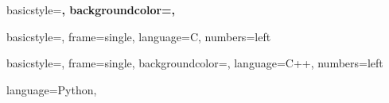    {basicstyle=\scriptsize\bf\ttfamily,
    backgroundcolor=\color{gray75},    
    }

   {basicstyle=\scriptsize,
	frame=single,
	language=C,
	numbers=left
   }
   
   {basicstyle=\small,
	frame=single,
	backgroundcolor=\color{gray75},
	language=C++,
	numbers=left
   }

   {language=Python,    
   }
\makeatother   